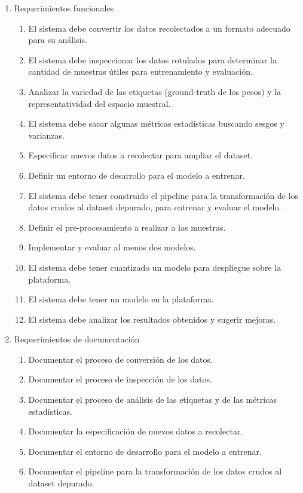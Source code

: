 \documentclass[
11pt, %
codirector, %
]{charter}
\begin{document}
\begin{enumerate}
	\item Requerimientos funcionales
		\begin{enumerate}
			\item El sistema debe convertir los datos recolectados a un formato adecuado 					  para su análisis.
			\item El sistema debe inspeccionar los datos rotulados para determinar la 						cantidad de muestras útiles para entrenamiento y 							evaluación.
			\item Analizar la variedad de las etiquetas (ground-truth de 					  los pesos) y la representatividad del espacio 								muestral.
			\item El sistema debe sacar algunas métricas estadísticas buscando sesgos y varianzas.
			\item Especificar nuevos datos a recolectar para ampliar el 						dataset.
			\item Definir un entorno de desarrollo para el modelo a 							entrenar.
			\item El sistema debe tener construido el pipeline para la transformación de los datos crudos al dataset depurado, para entrenar y evaluar el modelo.
			\item Definir el pre-procesamiento a realizar a las muestras.
			\item Implementar y evaluar al menos dos modelos.
			\item El sistema debe tener cuantizado un modelo para despliegue sobre la plataforma.
			\item El sistema debe tener un modelo en la plataforma.
			\item El sistema debe analizar los resultados obtenidos y sugerir mejoras.
		\end{enumerate}
	\item Requerimientos de documentación
		\begin{enumerate}
			\item Documentar el proceso de conversión de los datos.
			\item Documentar el proceso de inspección de los datos.
			\item Documentar el proceso de análisis de las etiquetas y de 						las métricas estadísticas.
			\item Documentar la especificación de nuevos datos a recolectar.
			\item Documentar el entorno de desarrollo para el modelo a entrenar.
			\item Documentar el pipeline para la transformación de los datos crudos al dataset depurado.

\end{enumerate}
\end{enumerate}
\end{document}
